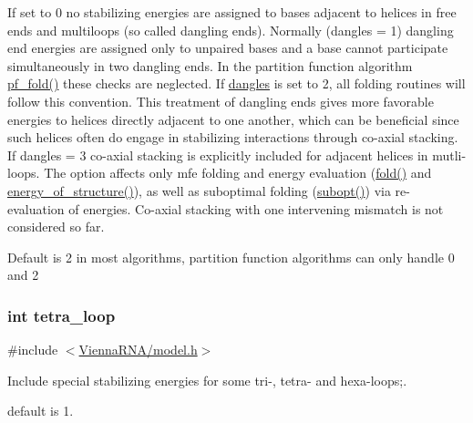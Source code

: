 If set to 0 no stabilizing energies are assigned to bases adjacent to helices in free ends and multiloops (so called dangling ends). Normally (dangles = 1) dangling end energies are assigned only to unpaired bases and a base cannot participate simultaneously in two dangling ends. In the partition function algorithm \hyperlink{group__pf__fold_gadc3db3d98742427e7001a7fd36ef28c2}{pf\+\_\+fold()} these checks are neglected. If \hyperlink{group__model__details_ga72b511ed1201f7e23ec437e468790d74}{dangles} is set to 2, all folding routines will follow this convention. This treatment of dangling ends gives more favorable energies to helices directly adjacent to one another, which can be beneficial since such helices often do engage in stabilizing interactions through co-\/axial stacking.~\newline
If dangles = 3 co-\/axial stacking is explicitly included for adjacent helices in mutli-\/loops. The option affects only mfe folding and energy evaluation (\hyperlink{group__mfe__fold__single_gaadafcb0f140795ae62e5ca027e335a9b}{fold()} and \hyperlink{eval_8h_af93986cb3cb29770ec9cca69c9fab8cf}{energy\+\_\+of\+\_\+structure()}), as well as suboptimal folding (\hyperlink{group__subopt__wuchty_ga700f662506a233e42dd7fda74fafd40e}{subopt()}) via re-\/evaluation of energies. Co-\/axial stacking with one intervening mismatch is not considered so far.

Default is 2 in most algorithms, partition function algorithms can only handle 0 and 2 
\subsubsection[{\texorpdfstring{tetra\+\_\+loop}{tetra_loop}}]{\setlength{\rightskip}{0pt plus 5cm}int tetra\+\_\+loop}\hypertarget{group__model__details_ga4f6265bdf0ead7ff4628a360adbfd77e}{}\label{group__model__details_ga4f6265bdf0ead7ff4628a360adbfd77e}


{\ttfamily \#include $<$\hyperlink{model_8h}{Vienna\+R\+N\+A/model.\+h}$>$}



Include special stabilizing energies for some tri-\/, tetra-\/ and hexa-\/loops;. 

default is 1. 
